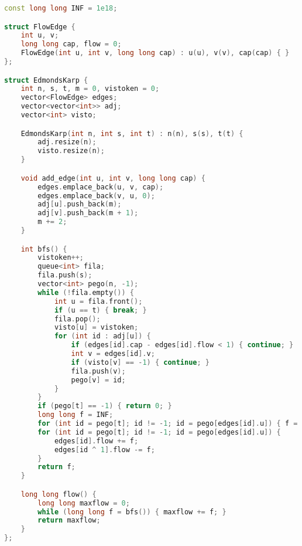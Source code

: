 \documentclass[11pt, a4paper, twoside]{article}
\begin{document}
\begin{lstlisting}[language=C++]
const long long INF = 1e18;

struct FlowEdge {
    int u, v;
    long long cap, flow = 0;
    FlowEdge(int u, int v, long long cap) : u(u), v(v), cap(cap) { }
};

struct EdmondsKarp {
    int n, s, t, m = 0, vistoken = 0;
    vector<FlowEdge> edges;
    vector<vector<int>> adj;
    vector<int> visto;

    EdmondsKarp(int n, int s, int t) : n(n), s(s), t(t) {
        adj.resize(n);
        visto.resize(n);
    }

    void add_edge(int u, int v, long long cap) {
        edges.emplace_back(u, v, cap);
        edges.emplace_back(v, u, 0);
        adj[u].push_back(m);
        adj[v].push_back(m + 1);
        m += 2;
    }

    int bfs() {
        vistoken++;
        queue<int> fila;
        fila.push(s);
        vector<int> pego(n, -1);
        while (!fila.empty()) {
            int u = fila.front();
            if (u == t) { break; }
            fila.pop();
            visto[u] = vistoken;
            for (int id : adj[u]) {
                if (edges[id].cap - edges[id].flow < 1) { continue; }
                int v = edges[id].v;
                if (visto[v] == -1) { continue; }
                fila.push(v);
                pego[v] = id;
            }
        }
        if (pego[t] == -1) { return 0; }
        long long f = INF;
        for (int id = pego[t]; id != -1; id = pego[edges[id].u]) { f = min(f, edges[id].cap - edges[id].flow); }
        for (int id = pego[t]; id != -1; id = pego[edges[id].u]) {
            edges[id].flow += f;
            edges[id ^ 1].flow -= f;
        }
        return f;
    }

    long long flow() {
        long long maxflow = 0;
        while (long long f = bfs()) { maxflow += f; }
        return maxflow;
    }
};
\end{lstlisting}
\end{document}
